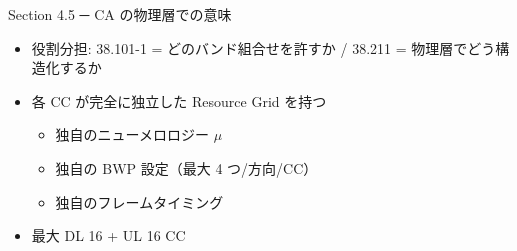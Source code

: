 \begin{frame}{Section 4.5 ─ CA の物理層での意味}
\begin{itemize}
  \item 役割分担: 38.101-1 = どのバンド組合せを許すか / 38.211 = 物理層でどう構造化するか
  \item 各 CC が完全に独立した Resource Grid を持つ
    \begin{itemize}
      \item 独自のニューメロロジー $\mu$
      \item 独自の BWP 設定（最大 4 つ/方向/CC）
      \item 独自のフレームタイミング
    \end{itemize}
  \item 最大 DL 16 + UL 16 CC
\end{itemize}
\end{frame}

